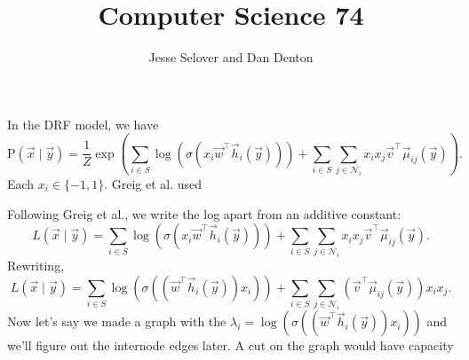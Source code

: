 \documentclass[12pt]{article}
\newcommand{\p}{\text{P}}
\theoremstyle{remark}
\begin{document}
\title{Computer Science 74}
\author{Jesse Selover and Dan Denton}
\maketitle


In the DRF model, we have
\[
\p(\vec{x}\mid\vec{y}) = \frac{1}{Z} \exp\left(\sum_{i\in S}
  \log(\sigma(x_i \vec{w}^{\top}\vec{h}_i(\vec{y}))) + \sum_{i \in S}
  \sum_{j \in \mathcal{N}_i}
  x_ix_j\vec{v}^{\top}\vec{\mu}_{ij}(\vec{y}) \right).
\]
Each $x_i \in \{-1,1\}$. Greig et al. used 

Following Greig et al., we write the log apart from an additive
constant:
\[
L(\vec{x} \mid \vec{y}) = \sum_{i \in S} \log(\sigma(x_i
\vec{w}^{\top}\vec{h}_i(\vec{y}))) + \sum_{i \in S}\sum_{j \in \mathcal{N}_i}
x_ix_j\vec{v}^{\top}\vec{\mu}_{ij}(\vec{y}).
\]
Rewriting,
\[
L(\vec{x} \mid \vec{y}) = \sum_{i \in S}
\log(\sigma((\vec{w}^{\top}\vec{h}_i(\vec{y})) x_i)) + \sum_{i \in S}\sum_{j \in \mathcal{N}_i}
(\vec{v}^{\top}\vec{\mu}_{ij}(\vec{y}))x_ix_j.
\]
Now let's say we made a graph with the $\lambda_i =
\log(\sigma((\vec{w}^{\top}\vec{h}_i(\vec{y})) x_i))$ and we'll figure
out the internode edges later.
A cut on the graph would have capacity

\end{document}
